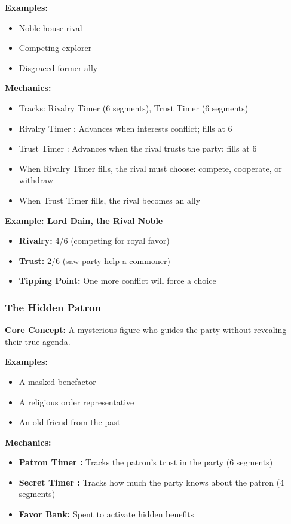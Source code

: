 \documentclass[10pt]{article}
\begin{document}
\textbf{Examples:}
\begin{itemize}
  \item Noble house rival
  \item Competing explorer
  \item Disgraced former ally
\end{itemize}

\textbf{Mechanics:}
\begin{itemize}
  \item Tracks: Rivalry Timer (6 segments), Trust Timer (6 segments)
  \item Rivalry Timer : Advances when interests conflict; fills at 6
  \item Trust Timer : Advances when the rival trusts the party; fills at 6
  \item When Rivalry Timer fills, the rival must choose: compete, cooperate, or withdraw
  \item When Trust Timer fills, the rival becomes an ally
\end{itemize}

\textbf{Example: Lord Dain, the Rival Noble}
\begin{itemize}
  \item \textbf{Rivalry:} 4/6 (competing for royal favor)
  \item \textbf{Trust:} 2/6 (saw party help a commoner)
  \item \textbf{Tipping Point:} One more conflict will force a choice
\end{itemize}

\subsubsection{The Hidden Patron}

\textbf{Core Concept:} A mysterious figure who guides the party without revealing their true agenda.

\textbf{Examples:}
\begin{itemize}
  \item A masked benefactor
  \item A religious order representative
  \item An old friend from the past
\end{itemize}

\textbf{Mechanics:}
\begin{itemize}
  \item \textbf{Patron Timer :} Tracks the patron's trust in the party (6 segments)
  \item \textbf{Secret Timer :} Tracks how much the party knows about the patron (4 segments)
  \item \textbf{Favor Bank:} Spent to activate hidden benefits
\end{itemize}
\end{document}
